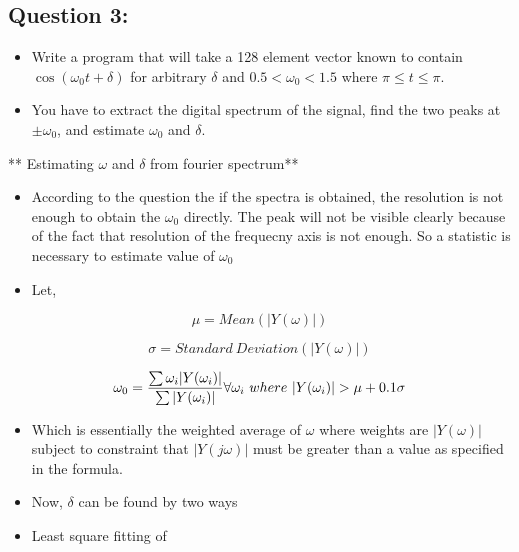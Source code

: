 \documentclass[10pt,a4paper]{article}
\providecommand{\tightlist}{%
      \setlength{\itemsep}{0pt}\setlength{\parskip}{0pt}}
\begin{document}
	

	
		
    \subsection{Question 3:}\label{question-3}

\begin{itemize}
\tightlist
\item
  Write a program that will take a 128 element vector known to contain
  \(\cos(\omega_0 t + \delta)\) for arbitrary \(\delta\) and
  \(0.5 < \omega_0 < 1.5\) where \(\pi \leq t \leq \pi\).
\item
  You have to extract the digital spectrum of the signal, find the two
  peaks at \(\pm \omega_0\), and estimate \(\omega_0\) and \(\delta\).
\end{itemize}

** Estimating \(\omega\) and \(\delta\) from fourier spectrum**

\begin{itemize}
\item
  According to the question the if the spectra is obtained, the
  resolution is not enough to obtain the \(\omega_0\) directly. The peak
  will not be visible clearly because of the fact that resolution of the
  frequecny axis is not enough. So a statistic is necessary to estimate
  value of \(\omega_0\)
\item
  Let,
\end{itemize}

\begin{equation}
\mu = Mean(|Y(\omega)|)
\end{equation}

\begin{equation}
\sigma = Standard\ Deviation(|Y(\omega)|)
\end{equation}

\begin{equation}
\omega_0 = \frac{\sum \omega_i |Y(\omega_i)|}{\sum |Y(\omega_i)|} \\
\\
\forall \omega_i\ where\ |Y(\omega_i)| > \mu + 0.1\sigma
\end{equation}

\begin{itemize}
\item
  Which is essentially the weighted average of \(\omega\) where weights
  are \(|Y(\omega)|\) subject to constraint that \(|Y(j\omega)|\) must
  be greater than a value as specified in the formula.
\item
  Now, \(\delta\) can be found by two ways
\item
  Least square fitting of
\end{itemize}
\end{document}
